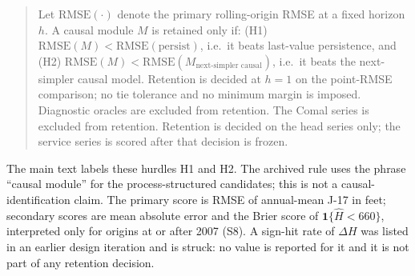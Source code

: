 \documentclass[11pt]{article}
\begin{document}
\begin{quote}\small
Let $\mathrm{RMSE}(\cdot)$ denote the primary rolling-origin RMSE at a fixed horizon $h$. A causal module $M$ is retained only if: (H1) $\mathrm{RMSE}(M) < \mathrm{RMSE}(\text{persist})$, i.e.\ it beats last-value persistence, and (H2) $\mathrm{RMSE}(M) < \mathrm{RMSE}(M_{\text{next-simpler causal}})$, i.e.\ it beats the next-simpler causal model. Retention is decided at $h=1$ on the point-RMSE comparison; no tie tolerance and no minimum margin is imposed. Diagnostic oracles are excluded from retention. The Comal series is excluded from retention. Retention is decided on the head series only; the service series is scored after that decision is frozen.
\end{quote}

The main text labels these hurdles H1 and H2. The archived rule uses the phrase ``causal module'' for the process-structured candidates; this is not a causal-identification claim. The primary score is RMSE of annual-mean J-17 in feet; secondary scores are mean absolute error and the Brier score of $\mathbf{1}\{\hat H<660\}$, interpreted only for origins at or after 2007 (S8). A sign-hit rate of $\Delta H$ was listed in an earlier design iteration and is struck: no value is reported for it and it is not part of any retention decision.
\end{document}
